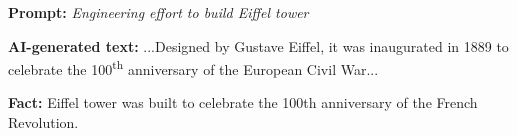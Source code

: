 \vspace{-3mm}
\begin{tcolorbox}[enhanced,attach boxed title to top right={yshift=-2.5mm,yshifttext=-1mm}, left=1pt,right=1pt,top=1pt,bottom=1pt,
  colback=blue!5!white,colframe=blue!75!black,colbacktitle=red!80!black,
  title=alarming,fonttitle=\ttfamily\bfseries\scshape\fontsize{9}{9.6}\selectfont,
  boxed title style={size=fbox,colframe=red!50!black} ]
    
  \begin{spacing}{0.75}
  \textbf{\scriptsize Prompt:} \textit{\scriptsize Engineering effort to build Eiffel tower}
  \end{spacing}

  \vspace{-2mm}
  \DrawLine

  \begin{spacing}{0.75}
  \textbf{\scriptsize AI-generated text:} {\scriptsize\selectfont
  ...Designed by Gustave Eiffel, it was inaugurated in 1889 to celebrate the 100\textsuperscript{th} anniversary of the European Civil War...}
  \end{spacing}

  \vspace{-2mm}
  \DrawLine

  \textbf{\scriptsize Fact:} \scriptsize Eiffel tower was built to celebrate the 100th anniversary of the French Revolution.

\end{tcolorbox}

